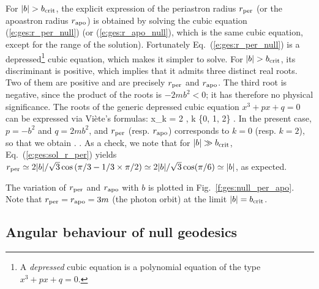 For $|b| > b_{\rm crit}$, the explicit expression of the periastron radius
$r_{\rm per}$ (or the apoastron radius $r_{\rm apo}$)
is obtained by solving the cubic equation (\ref{e:ges:r_per_null})
(or (\ref{e:ges:r_apo_null}), which is the same cubic equation, except for
the range of the solution). Fortunately Eq.~(\ref{e:ges:r_per_null})
is a depressed\footnote{A \emph{depressed} cubic equation is a polynomial equation
of the type $x^3 + p x + q = 0$.} cubic equation, which makes
it simpler to solve. For $|b| > b_{\rm crit}$, its discriminant is positive, which
implies that it admits three distinct real roots. Two of them are positive
and are precisely $r_{\rm per}$ and $r_{\rm apo}$. The third root is negative,
since the product of the roots is $-2mb^2 < 0$; it has therefore no
physical significance. The roots of the generic depressed cubic
equation $x^3 + p x + q = 0$ can be expressed via Viète's formulas:
\be
    x_k = 2  \cos {},
        \qquad k \in \{0, 1, 2\} .
\ee
In the present case, $p= - b^2$ and $q = 2 m b^2$,
and $r_{\rm per}$ (resp. $r_{\rm apo}$) corresponds to $k=0$
(resp. $k=2$), so that we obtain
\be \label{e:ges:sol_r_per}
  .
\ee
\be \label{e:ges:sol_r_apo}
   .
\ee
As a check, we note that for $|b|\gg b_{\rm crit}$, Eq.~(\ref{e:ges:sol_r_per})
yields $r_{\rm per} \simeq 2|b|/\sqrt{3} \cos\left(\pi/3 -1/3 \times \pi/2 \right)
\simeq 2|b|/\sqrt{3} \cos(\pi/6) \simeq |b|$, as expected.

The variation of $r_{\rm per}$ and $r_{\rm apo}$ with $b$ is plotted
in Fig.~\ref{f:ges:null_per_apo}. Note that $r_{\rm per} = r_{\rm apo} = 3 m$
(the photon orbit) at the limit $|b| = b_{\rm crit}$.



\subsection{Angular behaviour of null geodesics}

